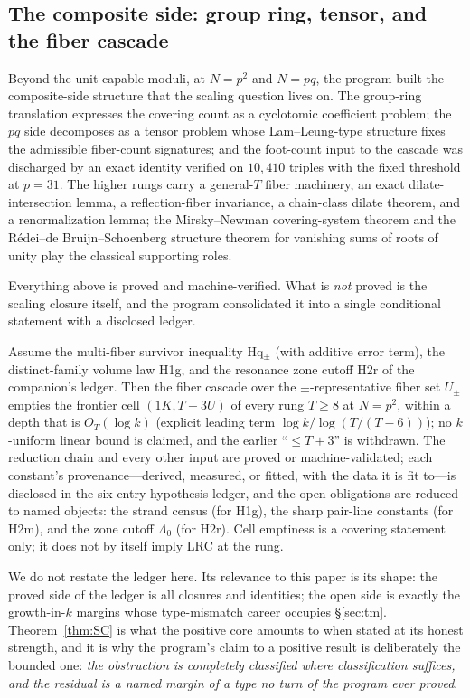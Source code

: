 \subsection{The composite side: group ring, tensor, and the fiber
cascade}

Beyond the unit capable moduli, at $N=p^2$ and $N=pq$, the program built
the composite-side structure that the scaling question lives on. The
group-ring translation expresses the covering count as a cyclotomic
coefficient problem; the $pq$ side decomposes as a tensor problem whose
Lam--Leung-type structure \cite{LamLeung} fixes the admissible
fiber-count signatures; and the foot-count input to the cascade was
discharged by an exact identity verified on $10{,}410$ triples with the
fixed threshold at $p=31$. The higher rungs carry a general-$T$ fiber
machinery, an exact dilate-intersection lemma, a reflection-fiber
invariance, a chain-class dilate theorem, and a renormalization lemma;
the Mirsky--Newman covering-system theorem and the
R\'edei--de Bruijn--Schoenberg structure theorem for vanishing sums of
roots of unity \cite{MirskyNewman,LamLeung} play the classical
supporting roles.

Everything above is proved and machine-verified. What is \emph{not}
proved is the scaling closure itself, and the program consolidated it
into a single conditional statement with a disclosed ledger.

\begin{theorem}\label{thm:SC}
Assume the multi-fiber survivor inequality Hq$_\pm$ (with additive error
term), the distinct-family volume law H1g, and the resonance zone cutoff
H2r of the companion's ledger. Then the fiber cascade over the
$\pm$-representative fiber set $U_\pm$ empties the frontier cell
$(1K,T{-}3U)$ of every rung $T\ge8$ at $N=p^2$, within a depth that is
$O_T(\log k)$ (explicit leading term $\log k/\log(T/(T-6))$); no
$k$-uniform linear bound is claimed, and the earlier ``$\le T+3$'' is
withdrawn. The reduction chain and every other input are proved or
machine-validated; each constant's provenance---derived, measured, or
fitted, with the data it is fit to---is disclosed in the six-entry
hypothesis ledger, and the open obligations are reduced to named objects:
the strand census (for H1g), the sharp pair-line constants (for H2m), and
the zone cutoff $\Lambda_0$ (for H2r). Cell emptiness is a covering
statement only; it does not by itself imply $\mathrm{LRC}$ at the rung.
\end{theorem}

We do not restate the ledger here. Its relevance to this paper is its
shape: the proved side of the ledger is all closures and identities; the
open side is exactly the growth-in-$k$ margins whose type-mismatch
career occupies \S\ref{sec:tm}. Theorem~\ref{thm:SC} is what the positive
core amounts to when stated at its honest strength, and it is why the
program's claim to a positive result is deliberately the bounded one:
\emph{the obstruction is completely classified where classification
suffices, and the residual is a named margin of a type no turn of the
program ever proved}.
